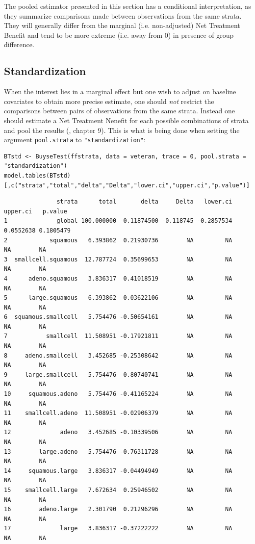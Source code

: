 \documentclass[12pt]{article}
\newcommand\Warning[1][3ex]{%
\renewcommand\stacktype{L}%
\scaleto{\stackon[1.3pt]{\color{red}$\triangle$}{\tiny\bfseries !}}{#1}%
\xspace
}
\begin{document}
\Warning The pooled estimator presented in this section has a
conditional interpretation, as they summarize comparisons made between
observations from the same strata. They will generally differ from the
marginal (i.e. non-adjusted) Net Treatment Benefit and tend to be more
extreme (i.e. away from 0) in presence of group difference.

\subsection{Standardization}
\label{sec:orgfe25805}

When the interest lies in a marginal effect but one wish to adjust on
baseline covariates to obtain more precise estimate, one should \emph{not}
restrict the comparisons between pairs of observations from the same
strata. Instead one should estimate a Net Treatment Nenefit for each
possible combinations of strata and pool the results
(\cite{buyse2025gpc}, chapter 9). This is what is being done when
setting the argument \texttt{pool.strata} to \texttt{"standardization"}:
\lstset{language=r,label= ,caption= ,captionpos=b,numbers=none}
\begin{lstlisting}
BTstd <- BuyseTest(ffstrata, data = veteran, trace = 0, pool.strata = "standardization")
model.tables(BTstd)[,c("strata","total","delta","Delta","lower.ci","upper.ci","p.value")]
\end{lstlisting}

\begin{verbatim}
               strata      total       delta     Delta   lower.ci  upper.ci   p.value
1              global 100.000000 -0.11874500 -0.118745 -0.2857534 0.0552638 0.1805479
2            squamous   6.393862  0.21930736        NA         NA        NA        NA
3  smallcell.squamous  12.787724  0.35699653        NA         NA        NA        NA
4      adeno.squamous   3.836317  0.41018519        NA         NA        NA        NA
5      large.squamous   6.393862  0.03622106        NA         NA        NA        NA
6  squamous.smallcell   5.754476 -0.50654161        NA         NA        NA        NA
7           smallcell  11.508951 -0.17921811        NA         NA        NA        NA
8     adeno.smallcell   3.452685 -0.25308642        NA         NA        NA        NA
9     large.smallcell   5.754476 -0.80740741        NA         NA        NA        NA
10     squamous.adeno   5.754476 -0.41165224        NA         NA        NA        NA
11    smallcell.adeno  11.508951 -0.02906379        NA         NA        NA        NA
12              adeno   3.452685 -0.10339506        NA         NA        NA        NA
13        large.adeno   5.754476 -0.76311728        NA         NA        NA        NA
14     squamous.large   3.836317 -0.04494949        NA         NA        NA        NA
15    smallcell.large   7.672634  0.25946502        NA         NA        NA        NA
16        adeno.large   2.301790  0.21296296        NA         NA        NA        NA
17              large   3.836317 -0.37222222        NA         NA        NA        NA
\end{verbatim}
\end{document}

